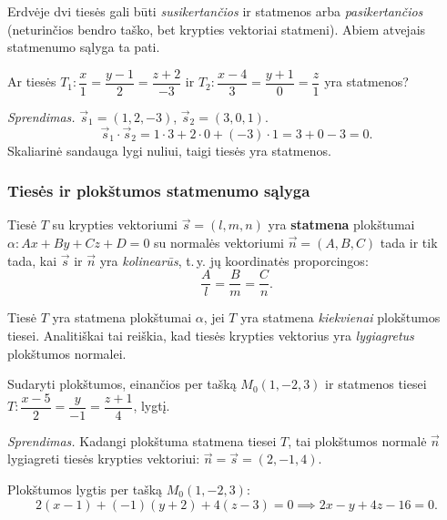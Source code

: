 \begin{remark}
Erdvėje dvi tiesės gali būti \emph{susikertančios} ir statmenos arba
\emph{pasikertančios} (neturinčios bendro taško, bet krypties vektoriai
statmeni). Abiem atvejais statmenumo sąlyga ta pati.
\end{remark}

\begin{example}
Ar tiesės $T_1\colon \dfrac{x}{1} = \dfrac{y-1}{2} = \dfrac{z+2}{-3}$ ir
$T_2\colon \dfrac{x-4}{3} = \dfrac{y+1}{0} = \dfrac{z}{1}$ yra statmenos?

\textit{Sprendimas.} $\vec{s}_1 = (1, 2, -3)$, $\vec{s}_2 = (3, 0, 1)$.
\[
  \vec{s}_1 \cdot \vec{s}_2 = 1 \cdot 3 + 2 \cdot 0 + (-3) \cdot 1 = 3 + 0 - 3 = 0.
\]
Skaliarinė sandauga lygi nuliui, taigi tiesės yra statmenos.
\end{example}

\subsubsection*{Tiesės ir plokštumos statmenumo sąlyga}

\begin{theorem}
Tiesė $T$ su krypties vektoriumi $\vec{s} = (l, m, n)$ yra \textbf{statmena}
plokštumai $\alpha\colon Ax + By + Cz + D = 0$ su normalės vektoriumi
$\vec{n} = (A, B, C)$ tada ir tik tada, kai $\vec{s}$ ir $\vec{n}$ yra
\emph{kolinearūs}, t.\,y. jų koordinatės proporcingos:
\[
  \frac{A}{l} = \frac{B}{m} = \frac{C}{n}.
\]
\end{theorem}

\begin{tcolorbox}[colback=green!5!white, colframe=green!40!black,
  title=Geometrinė prasmė]
Tiesė $T$ yra statmena plokštumai $\alpha$, jei $T$ yra statmena
\emph{kiekvienai} plokštumos tiesei. Analitiškai tai reiškia, kad tiesės
krypties vektorius yra \emph{lygiagretus} plokštumos normalei.
\end{tcolorbox}

\begin{example}
Sudaryti plokštumos, einančios per tašką $M_0(1, -2, 3)$ ir statmenos
tiesei $T\colon \dfrac{x-5}{2} = \dfrac{y}{-1} = \dfrac{z+1}{4}$, lygtį.

\textit{Sprendimas.} Kadangi plokštuma statmena tiesei $T$, tai plokštumos
normalė $\vec{n}$ lygiagreti tiesės krypties vektoriui:
$\vec{n} = \vec{s} = (2, -1, 4)$.

Plokštumos lygtis per tašką $M_0(1, -2, 3)$:
\[
  2(x - 1) + (-1)(y + 2) + 4(z - 3) = 0
  \implies 2x - y + 4z - 16 = 0.
\]
\end{example}

